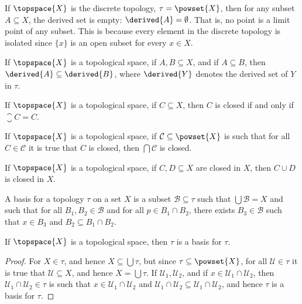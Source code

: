     \begin{example}
        If $\topspace{X}$ is the discrete topology, $\tau=\powset{X}$, then
        for any subset $A\subseteq{X}$, the derived set is empty:
        $\derived{A}=\emptyset$. That is, no point is a limit point of any
        subset. This is because every element in the discrete topology is
        isolated since $\{x\}$ is an open subset for every $x\in{X}$.
    \end{example}
    \begin{theorem}
        If $\topspace{X}$ is a topological space, if $A,B\subseteq{X}$, and
        if $A\subseteq{B}$, then $\derived{A}\subseteq\derived{B}$, where
        $\derived{Y}$ denotes the derived set of $Y$ in $\tau$.
    \end{theorem}
    \begin{theorem}
        If $\topspace{X}$ is a topological space, if $C\subseteq{X}$, then
        $C$ is closed if and only if $\closure{C}=C$.
    \end{theorem}
    \begin{theorem}
        If $\topspace{X}$ is a topological space, if
        $\mathcal{C}\subseteq\powset{X}$ is such that for all
        $C\in\mathcal{C}$ it is true that $C$ is closed, then
        $\bigcap\mathcal{C}$ is closed.
    \end{theorem}
    \begin{theorem}
        If $\topspace{X}$ is a topological space, if $C,D\subseteq{X}$ are
        closed in $X$, then $C\cup{D}$ is closed in $X$.
    \end{theorem}
    \begin{definition}
        A basis for a topology $\tau$ on a set $X$ is a subset
        $\mathcal{B}\subseteq\tau$ such that $\bigcup\mathcal{B}=X$ and such
        that for all $B_{1},B_{2}\in\mathcal{B}$ and for all
        $p\in{B}_{1}\cap{B}_{2}$, there exists $B_{3}\in\mathcal{B}$ such
        that $x\in{B}_{3}$ and $B_{2}\subseteq{B}_{1}\cap{B}_{2}$.
    \end{definition}
    \begin{theorem}
        If $\topspace{X}$ is a topological space, then $\tau$ is a basis
        for $\tau$.
    \end{theorem}
    \begin{proof}
        For $X\in\tau$, and hence $X\subseteq\bigcup\tau$, but since
        $\tau\subseteq\powset{X}$, for all $\mathcal{U}\in\tau$ it is true
        that $\mathcal{U}\subseteq{X}$, and hence $X=\bigcup\tau$. If
        $\mathcal{U}_{1},\mathcal{U}_{2}$, and if
        $x\in\mathcal{U}_{1}\cap\mathcal{U}_{2}$, then
        $\mathcal{U}_{1}\cap\mathcal{U}_{2}\in\tau$ is such that
        $x\in\mathcal{U}_{1}\cap\mathcal{U}_{2}$ and
        $\mathcal{U}_{1}\cap\mathcal{U}_{2}\subseteq%
         \mathcal{U}_{1}\cap\mathcal{U}_{2}$, and hence $\tau$ is a basis
        for $\tau$.
    \end{proof}
